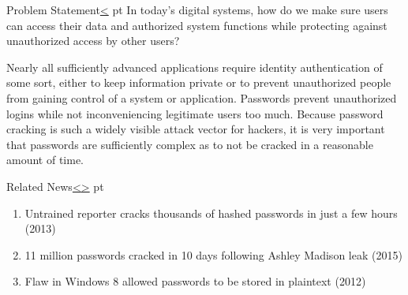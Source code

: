 \documentclass[12pt]{extarticle}
\newenvironment{instructionblock}{\Large\bgroup}{\egroup}
\begin{document}
	
	\pagebreak
	\tableofcontents
	
	
	\pagebreak
	\setcounter{section}{1}
	
	\pagebreak
	\begin{slide}{Problem Statement}{\hyperref[slide 2]{\textless}}
		 pt
		\begin{instructionblock}
			In today's digital systems, how do we make sure users can access their data and authorized system functions while protecting against unauthorized access by other users?
		\end{instructionblock}
	\end{slide}
	
	Nearly all sufficiently advanced applications require identity authentication of some sort, either to keep information private or to prevent unauthorized people from gaining control of a system or application. Passwords prevent unauthorized logins while not inconveniencing legitimate users too much. Because password cracking is such a widely visible attack vector for hackers, it is very important that passwords are sufficiently complex as to not be cracked in a reasonable amount of time. 
	
	
	
	\pagebreak
	\begin{slide}{Related News}{\hyperref[slide 1]{\textless}\hyperref[slide 3]{\textgreater}}
		 pt
		\begin{instructionblock}
			\begin{enumerate}
				\item Untrained reporter cracks thousands of hashed passwords in just a few hours (2013) \cite{ars}
				\item 11 million passwords cracked in 10 days following Ashley Madison leak (2015) \cite{ashley}
				\item Flaw in Windows 8 allowed passwords to be stored in plaintext (2012) \cite{msft}
			\end{enumerate}
		\end{instructionblock}
	\end{slide}
	
\end{document}
